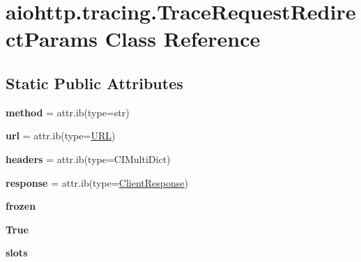 \hypertarget{classaiohttp_1_1tracing_1_1_trace_request_redirect_params}{}\section{aiohttp.\+tracing.\+Trace\+Request\+Redirect\+Params Class Reference}
\label{classaiohttp_1_1tracing_1_1_trace_request_redirect_params}
\subsection*{Static Public Attributes}
\begin{DoxyCompactItemize}
\item 
\mbox{\label{classaiohttp_1_1tracing_1_1_trace_request_redirect_params_aaef721d1d9c989d542e8fb9f2186327a}} 
{\bfseries method} = attr.\+ib(type=str)
\item 
\mbox{\label{classaiohttp_1_1tracing_1_1_trace_request_redirect_params_a11e24049f0fde48f9ebce349931ed626}} 
{\bfseries url} = attr.\+ib(type=\hyperlink{classyarl_1_1_u_r_l}{U\+RL})
\item 
\mbox{\label{classaiohttp_1_1tracing_1_1_trace_request_redirect_params_a49874267670b39eb566df3c72a78ed65}} 
{\bfseries headers} = attr.\+ib(type=C\+I\+Multi\+Dict)
\item 
\mbox{\label{classaiohttp_1_1tracing_1_1_trace_request_redirect_params_a8c180dbd1fd2c9480ad6c86c83552e39}} 
{\bfseries response} = attr.\+ib(type=\hyperlink{classaiohttp_1_1client__reqrep_1_1_client_response}{Client\+Response})
\item 
\mbox{\label{classaiohttp_1_1tracing_1_1_trace_request_redirect_params_a283be559cd945b4d6b5b4989fc6aa2ab}} 
{\bfseries frozen}
\item 
\mbox{\label{classaiohttp_1_1tracing_1_1_trace_request_redirect_params_a9327560ae6f683ec29f69c5fdca7f911}} 
{\bfseries True}
\item 
\mbox{\label{classaiohttp_1_1tracing_1_1_trace_request_redirect_params_a07b7aa120b4aa14a946c88e9bc8e3914}} 
{\bfseries slots}
\end{DoxyCompactItemize}


